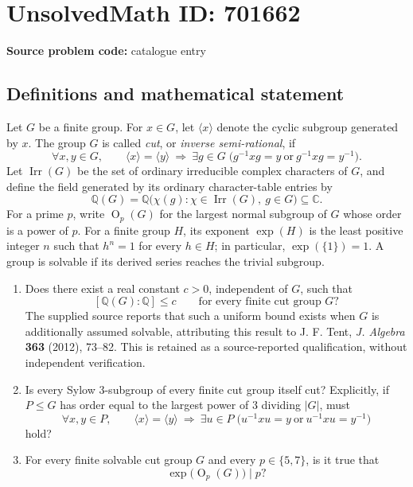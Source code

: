 \documentclass[11pt]{article}
\newcommand{\Q}{\mathbb{Q}}
\newcommand{\C}{\mathbb{C}}
\begin{document}
\section*{UnsolvedMath ID: 701662}
\textbf{Source problem code:} catalogue entry
\subsection{Definitions and mathematical statement}
Let \(G\) be a finite group. For \(x\in G\), let \(\langle x\rangle\) denote the cyclic subgroup generated by \(x\). The group \(G\) is called \emph{cut}, or \emph{inverse semi-rational}, if
\[
\forall x,y\in G,\qquad
\langle x\rangle=\langle y\rangle
\ \Longrightarrow\ 
\exists g\in G\;\bigl(g^{-1}xg=y\ \text{or}\ g^{-1}xg=y^{-1}\bigr).
\]
Let \(\operatorname{Irr}(G)\) be the set of ordinary irreducible complex characters of \(G\), and define the field generated by its ordinary character-table entries by
\[
\Q(G)=\Q\bigl(\chi(g):\chi\in\operatorname{Irr}(G),\ g\in G\bigr)\subseteq\C.
\]
For a prime \(p\), write \(\operatorname{O}_p(G)\) for the largest normal subgroup of \(G\) whose order is a power of \(p\). For a finite group \(H\), its exponent \(\exp(H)\) is the least positive integer \(n\) such that \(h^n=1\) for every \(h\in H\); in particular, \(\exp(\{1\})=1\). A group is solvable if its derived series reaches the trivial subgroup.

\begin{enumerate}
\item[(a)] Does there exist a real constant \(c>0\), independent of \(G\), such that
\[
[\Q(G):\Q]\leq c
\qquad\text{for every finite cut group }G?
\]
The supplied source reports that such a uniform bound exists when \(G\) is additionally assumed solvable, attributing this result to J. F. Tent, \emph{J. Algebra} \textbf{363} (2012), 73--82. This is retained as a source-reported qualification, without independent verification.

\item[(b)] Is every Sylow \(3\)-subgroup of every finite cut group itself cut? Explicitly, if \(P\leq G\) has order equal to the largest power of \(3\) dividing \(|G|\), must
\[
\forall x,y\in P,\qquad
\langle x\rangle=\langle y\rangle
\ \Longrightarrow\ 
\exists u\in P\;\bigl(u^{-1}xu=y\ \text{or}\ u^{-1}xu=y^{-1}\bigr)
\]
hold?

\item[(c)] For every finite solvable cut group \(G\) and every \(p\in\{5,7\}\), is it true that
\[
\exp\bigl(\operatorname{O}_p(G)\bigr)\mid p?
\]
\end{enumerate}
\end{document}
